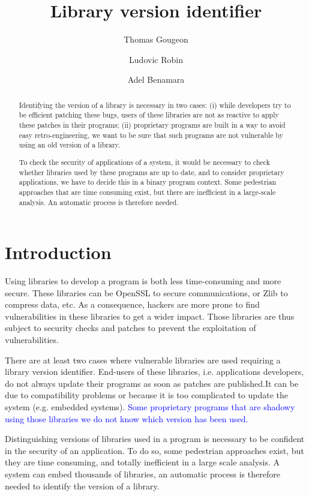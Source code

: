 \documentclass{article}
\title{Library version identifier}
\author{Thomas Gougeon \and Ludovic Robin \and Adel Benamara}
\newcommand{\ludo}[1]{\textcolor{blue}{#1}}
\begin{document}
	\maketitle
	
	\begin{abstract}

	Identifying the version of a library is necessary in two cases: (i) while developers try to be efficient patching these bugs, users of these libraries are not as reactive to apply these patches in their programs; (ii) proprietary programs are built in a way to avoid easy retro-engineering, we want to be sure that such programs are not vulnerable by using an old version of a library.

	To check the security of applications of a system, it would be necessary to check whether libraries used by these programs are up to date, and to consider proprietary applications, we have to decide this in a binary program context.
Some pedestrian approaches that are time consuming exist, but there are inefficient in a large-scale analysis. An automatic process is therefore needed.
	
	\end{abstract}

\section{Introduction}

	Using libraries to develop a program is both less time-consuming and more secure. These libraries can be OpenSSL to secure communications, or Zlib to compress data, etc. As a consequence, hackers are more prone to find vulnerabilities in these libraries to get a wider impact. Those libraries are thus subject to security checks and patches to prevent the exploitation of vulnerabilities. 
     
     There are at least two cases where vulnerable libraries are used requiring a library version identifier. End-users of these libraries, i.e. applications developers, do not always update their programs as soon as patches are published.It can be due to compatibility problems or because it is too complicated to update the system (e.g. embedded systems). \ludo{Some proprietary programs that are shadowy using those libraries we do not know which version has been used.}
     
	Distinguishing versions of libraries used in a program is necessary to be confident in the security of an application. To do so, some pedestrian approaches exist, but they are time consuming, and totally inefficient in a large scale analysis. A system can embed thousands of libraries, an automatic process is therefore needed to identify the version of a library.
    
\end{document}
